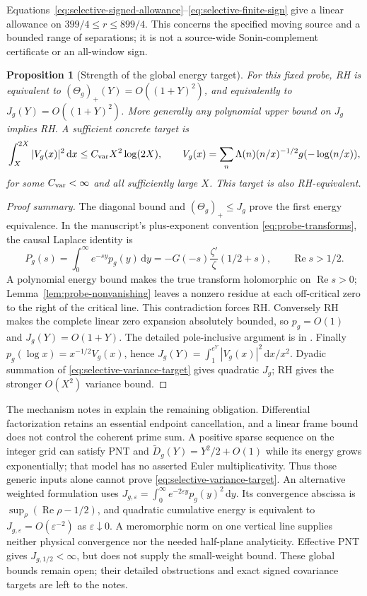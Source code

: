 \documentclass[11pt]{article}
\numberwithin{equation}{section}
\newtheorem{proposition}[theorem]{Proposition}
\theoremstyle{definition}
\theoremstyle{remark}
\newcommand{\Rea}{\operatorname{Re}}
\newcommand{\dd}{\,\mathrm d}
\begin{document}
Equations~\eqref{eq:selective-signed-allowance}--\eqref{eq:selective-finite-sign}
give a linear allowance on \(399/4\le r\le899/4\). This concerns
the specified moving source and a bounded range of separations; it is
not a source-wide Sonin-complement certificate or an all-window sign.

\begin{proposition}[Strength of the global energy target]
\label{prop:selective-global-target}
For this fixed probe, RH is equivalent to
\((\Theta_g)_+(Y)=O((1+Y)^2)\), and equivalently to
\(J_g(Y)=O((1+Y)^2)\). More generally any polynomial upper bound
on \(J_g\) implies RH. A sufficient concrete target is
\begin{equation}\label{eq:selective-variance-target}
\int_X^{2X}|V_g(x)|^2\dd x\le C_{\rm var}X^2\log(2X),\qquad
V_g(x)=\sum_n\Lambda(n)(n/x)^{-1/2}g(-\log(n/x)),
\end{equation}
for some \(C_{\rm var}<\infty\) and all sufficiently large \(X\).
This target is also RH-equivalent.
\end{proposition}
\begin{proof}[Proof summary]
The diagonal bound and \((\Theta_g)_+\le J_g\) prove the first
energy equivalence. In the manuscript's plus-exponent convention
\eqref{eq:probe-transforms}, the causal Laplace identity is
\[
P_g(s)=\int_0^\infty e^{-sy}p_g(y)\dd y
=-G(-s)\frac{\zeta'}{\zeta}(1/2+s),\qquad\Rea s>1/2.
\]
A polynomial energy bound makes the true transform holomorphic on
\(\Rea s>0\); Lemma~\ref{lem:probe-nonvanishing} leaves a nonzero
residue at each off-critical zero to the right of the critical line.
This contradiction forces RH. Conversely RH makes the complete linear
zero expansion absolutely bounded, so \(p_g=O(1)\) and
\(J_g(Y)=O(1+Y)\). The detailed pole-inclusive argument is in
\cite{SelectiveLossNotes}.
Finally \(p_g(\log x)=x^{-1/2}V_g(x)\), hence
\(J_g(Y)=\int_1^{e^Y}|V_g(x)|^2\dd x/x^2\).
Dyadic summation of \eqref{eq:selective-variance-target} gives quadratic
\(J_g\); RH gives the stronger \(O(X^2)\) variance bound.
\end{proof}

The mechanism notes in \cite{SelectiveLossNotes} explain the remaining
obligation. Differential factorization retains an essential endpoint
cancellation, and a linear frame bound does not control the coherent
prime sum. A positive sparse sequence on the integer grid can satisfy
PNT and \(\widetilde D_g(Y)=Y^2/2+O(1)\) while its energy grows exponentially;
that model has no asserted Euler multiplicativity. Thus those generic
inputs alone cannot prove \eqref{eq:selective-variance-target}.
An alternative weighted formulation uses
\(J_{g,\varepsilon}=\int_0^\infty e^{-2\varepsilon y}p_g(y)^2\dd y\).
Its convergence abscissa is
\(\sup_\rho(\Rea\rho-1/2)\), and quadratic cumulative energy is
equivalent to \(J_{g,\varepsilon}=O(\varepsilon^{-2})\) as
\(\varepsilon\downarrow0\). A meromorphic norm on one vertical
line supplies neither physical convergence nor the needed half-plane
analyticity. Effective PNT gives \(J_{g,1/2}<\infty\), but does not
supply the small-weight bound. These global bounds remain open; their detailed
obstructions and exact signed covariance targets are left to the notes.
\end{document}
